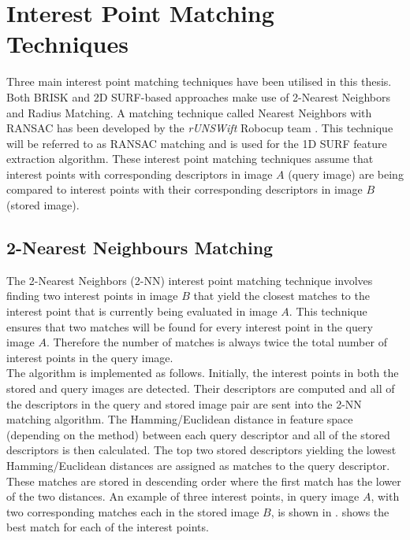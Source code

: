 

\section{Interest Point Matching Techniques}
\label{sec:matchingTechniques}
Three main interest point matching techniques have been utilised in this thesis. Both BRISK and 2D SURF-based approaches make use of 2-Nearest Neighbors and Radius Matching. A matching technique called Nearest Neighbors with RANSAC has been developed by the \textit{rUNSWift} Robocup team \citep{Anderson}. This technique will be referred to as RANSAC matching and is used for the 1D SURF feature extraction algorithm. These interest point matching techniques assume that interest points with corresponding descriptors in image $A$ (query image) are being compared to interest points with their corresponding descriptors in image $B$ (stored image). \\

\subsection{2-Nearest Neighbours Matching}
\label{sec:knn}
The 2-Nearest Neighbors (2-NN) interest point matching technique involves finding two interest points in image $B$ that yield the closest matches to the interest point that is currently being evaluated in image $A$. This technique ensures that two matches will be found for every interest point in the query image $A$. Therefore the number of matches is always twice the total number of interest points in the query image.\\

The algorithm is implemented as follows. Initially, the interest points in both the stored and query images are detected. Their descriptors are computed and all of the descriptors in the query and stored image pair are sent into the 2-NN matching algorithm. The Hamming/Euclidean distance in feature space (depending on the method) between each query descriptor and all of the stored descriptors is then calculated. The top two stored descriptors yielding the lowest Hamming/Euclidean distances are assigned as matches to the query descriptor. These matches are stored in descending order where the first match has the lower of the two distances. An example of three interest points, in query image $A$, with two corresponding matches each in the stored image $B$, is shown in .  shows the best match for each of the interest points.\\


